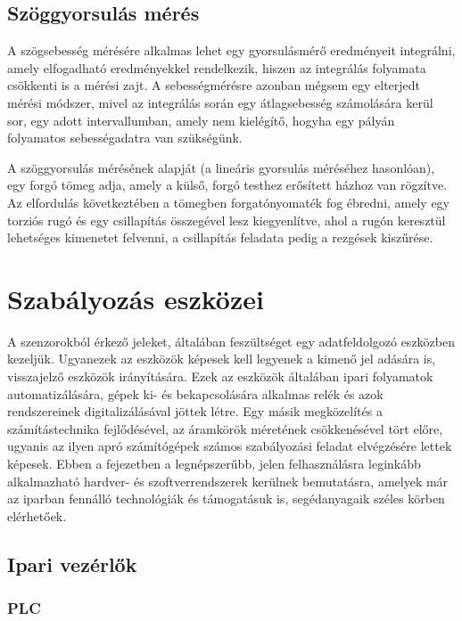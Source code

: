 \subsection{Szöggyorsulás mérés}

A szögsebesség mérésére alkalmas lehet egy gyorsulásmérő eredményeit integrálni, amely elfogadható eredményekkel rendelkezik, hiszen az integrálás folyamata csökkenti is a mérési zajt. A sebességmérésre azonban mégsem egy elterjedt mérési módszer, mivel az integrálás során egy átlagsebesség számolására kerül sor, egy adott intervallumban, amely nem kielégítő, hogyha egy pályán folyamatos sebességadatra van szükségünk.

A szöggyorsulás mérésének alapját (a lineáris gyorsulás méréséhez hasonlóan), egy forgó tömeg adja, amely a külső, forgó testhez erősített házhoz van rögzítve. Az elfordulás következtében a tömegben forgatónyomaték fog ébredni, amely egy torziós rugó és egy csillapítás összegével lesz kiegyenlítve, ahol a rugón keresztül lehetséges kimenetet felvenni, a csillapítás feladata pedig a rezgések kiszűrése. 

\section{Szabályozás eszközei}

A szenzorokból érkező jeleket, általában feszültséget egy adatfeldolgozó eszközben kezeljük. Ugyanezek az eszközök képesek kell legyenek a kimenő jel adására is, visszajelző eszközök irányítására. Ezek az eszközök általában ipari folyamatok automatizálására, gépek ki- és bekapcsolására alkalmas relék és azok rendszereinek digitalizálásával jöttek létre. Egy másik megközelítés a számítástechnika fejlődésével, az áramkörök méretének csökkenésével tört előre, ugyanis az ilyen apró számítógépek számos szabályozási feladat elvégzésére lettek képesek. Ebben a fejezetben a legnépszerűbb, jelen felhasználásra leginkább alkalmazható hardver- és szoftverrendszerek kerülnek bemutatásra, amelyek már az iparban fennálló technológiák és támogatásuk is, segédanyagaik széles körben elérhetőek.

\subsection{Ipari vezérlők}

\subsubsection{PLC}

